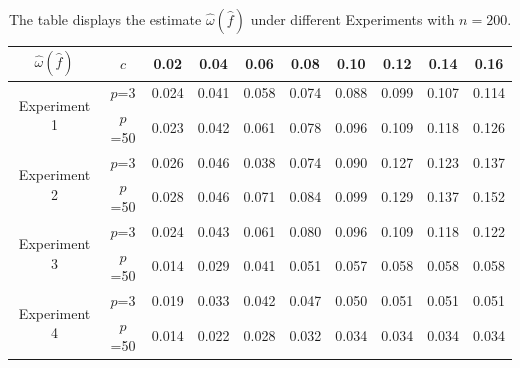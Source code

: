 \documentclass[12pt]{article}
\theoremstyle{plain}
\theoremstyle{definition}
\theoremstyle{remark}
\begin{document}
\begin{table}
\caption{ { The table displays the estimate ${\widehat{\omega}}(\widehat{f})$ under different Experiments with $n=200$.}}
\centering
{\begin{tabular}{cccccccccc}
\toprule
   ${\widehat{\omega}}(\widehat{f})$ &{$c$} &0.02&0.04&0.06&0.08&0.10&0.12&0.14&0.16\\
   \hline
   \multirow{2}{*}{Experiment 1}&   $p$=3 &   0.024& 0.041 &0.058& 0.074& 0.088 &0.099& 0.107 &0.114\\
   &  $p$=50 &0.023  &0.042 & 0.061  &0.078  &0.096 & 0.109 &0.118 & 0.126\\
   \hline
   \multirow{2}{*}{Experiment 2}&   $p$=3 &   0.026&  0.046&  0.038 & 0.074&  0.090 & 0.127&  0.123&  0.137\\
   &  $p$=50 &0.028  &0.046 & 0.071 &0.084  &0.099 &0.129  &0.137  &0.152\\
   \hline
    \multirow{2}{*}{Experiment 3}&   $p$=3 &0.024&  0.043&  0.061 & 0.080 & 0.096 & 0.109&   0.118&   0.122\\
   &  $p$=50 &0.014 &0.029 &0.041 &0.051& 0.057 &0.058&0.058 &0.058\\
   \hline
    \multirow{2}{*}{Experiment 4}&   $p$=3 &0.019&  0.033&  0.042  & 0.047&0.050&0.051&0.051&0.051\\
   &  $p$=50 &0.014 &0.022 &0.028&0.032&0.034& 0.034 &0.034 &0.034\\
     \bottomrule
\end{tabular}}

\end{table}
\end{document}
